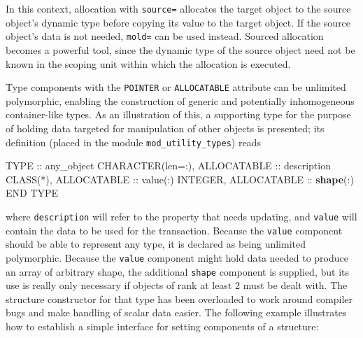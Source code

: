 \documentclass[
  paper=a4,
  ,captions=tableheading
]{scrartcl}
\newenvironment{Shaded}{\begin{snugshade}}{\end{snugshade}}
\newcommand{\DataTypeTok}[1]{\textcolor[rgb]{0.13,0.29,0.53}{#1}}
\newcommand{\FunctionTok}[1]{\textcolor[rgb]{0.13,0.29,0.53}{\textbf{#1}}}
\newcommand{\NormalTok}[1]{#1}
\begin{document}
In this context, allocation with \texttt{source=} allocates the target
object to the source object's dynamic type before copying its value to
the target object. If the source object's data is not needed,
\texttt{mold=} can be used instead. Sourced allocation becomes a
powerful tool, since the dynamic type of the source object need not be
known in the scoping unit within which the allocation is executed.

Type components with the \texttt{POINTER} or \texttt{ALLOCATABLE}
attribute can be unlimited polymorphic, enabling the construction of
generic and potentially inhomogeneous container-like types. As an
illustration of this, a supporting type for the purpose of holding data
targeted for manipulation of other objects is presented; its definition
(placed in the module \texttt{mod\_utility\_types}) reads

\begin{Shaded}
\begin{Highlighting}[]
\DataTypeTok{TYPE} \DataTypeTok{::}\NormalTok{ any\_object}
   \DataTypeTok{CHARACTER(len=:)}\NormalTok{, }\DataTypeTok{ALLOCATABLE} \DataTypeTok{::}\NormalTok{ description}
   \DataTypeTok{CLASS(*)}\NormalTok{, }\DataTypeTok{ALLOCATABLE} \DataTypeTok{::} \DataTypeTok{value}\NormalTok{(:)}
   \DataTypeTok{INTEGER}\NormalTok{, }\DataTypeTok{ALLOCATABLE} \DataTypeTok{::} \FunctionTok{shape}\NormalTok{(:)}
\DataTypeTok{END TYPE}
\end{Highlighting}
\end{Shaded}

where \texttt{description} will refer to the property that needs
updating, and \texttt{value} will contain the data to be used for the
transaction. Because the \texttt{value} component should be able to
represent any type, it is declared as being unlimited polymorphic.
Because the \texttt{value} component might hold data needed to produce
an array of arbitrary shape, the additional \texttt{shape} component is
supplied, but its use is really only necessary if objects of rank at
least 2 must be dealt with. The structure constructor for that type has
been overloaded to work around compiler bugs and make handling of scalar
data easier. The following example illustrates how to establish a simple
interface for setting components of a structure:
\end{document}
